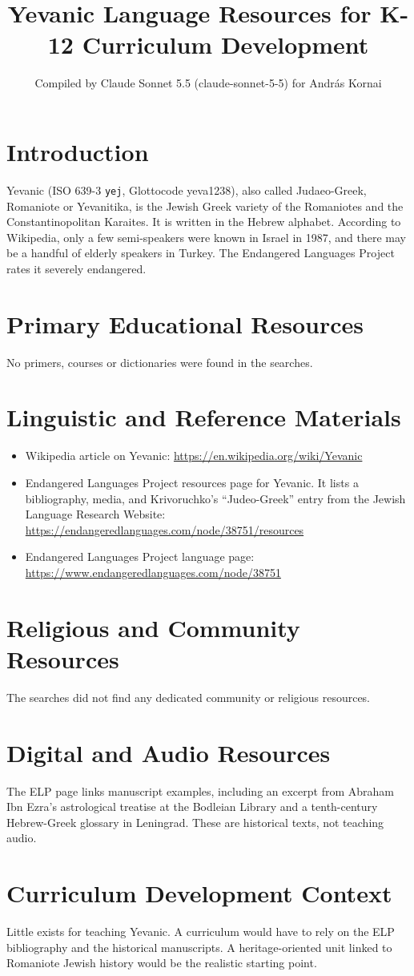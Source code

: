 \documentclass[12pt]{article}
\title{Yevanic Language Resources for K-12 Curriculum Development}
\author{Compiled by Claude Sonnet 5.5 (claude-sonnet-5-5) for Andr\'as Kornai}
\date{}
\begin{document}
\maketitle

\section{Introduction}
Yevanic (ISO 639-3 \texttt{yej}, Glottocode yeva1238), also called Judaeo-Greek, Romaniote or Yevanitika, is the Jewish Greek variety of the Romaniotes and the Constantinopolitan Karaites. It is written in the Hebrew alphabet. According to Wikipedia, only a few semi-speakers were known in Israel in 1987, and there may be a handful of elderly speakers in Turkey. The Endangered Languages Project rates it severely endangered.

\section{Primary Educational Resources}
No primers, courses or dictionaries were found in the searches.

\section{Linguistic and Reference Materials}
\begin{itemize}
\item Wikipedia article on Yevanic: \url{https://en.wikipedia.org/wiki/Yevanic}
\item Endangered Languages Project resources page for Yevanic. It lists a bibliography, media, and Krivoruchko's ``Judeo-Greek'' entry from the Jewish Language Research Website: \url{https://endangeredlanguages.com/node/38751/resources}
\item Endangered Languages Project language page: \url{https://www.endangeredlanguages.com/node/38751}
\end{itemize}

\section{Religious and Community Resources}
The searches did not find any dedicated community or religious resources.

\section{Digital and Audio Resources}
The ELP page links manuscript examples, including an excerpt from Abraham Ibn Ezra's astrological treatise at the Bodleian Library and a tenth-century Hebrew-Greek glossary in Leningrad. These are historical texts, not teaching audio.

\section{Curriculum Development Context}
Little exists for teaching Yevanic. A curriculum would have to rely on the ELP bibliography and the historical manuscripts. A heritage-oriented unit linked to Romaniote Jewish history would be the realistic starting point.
\end{document}

